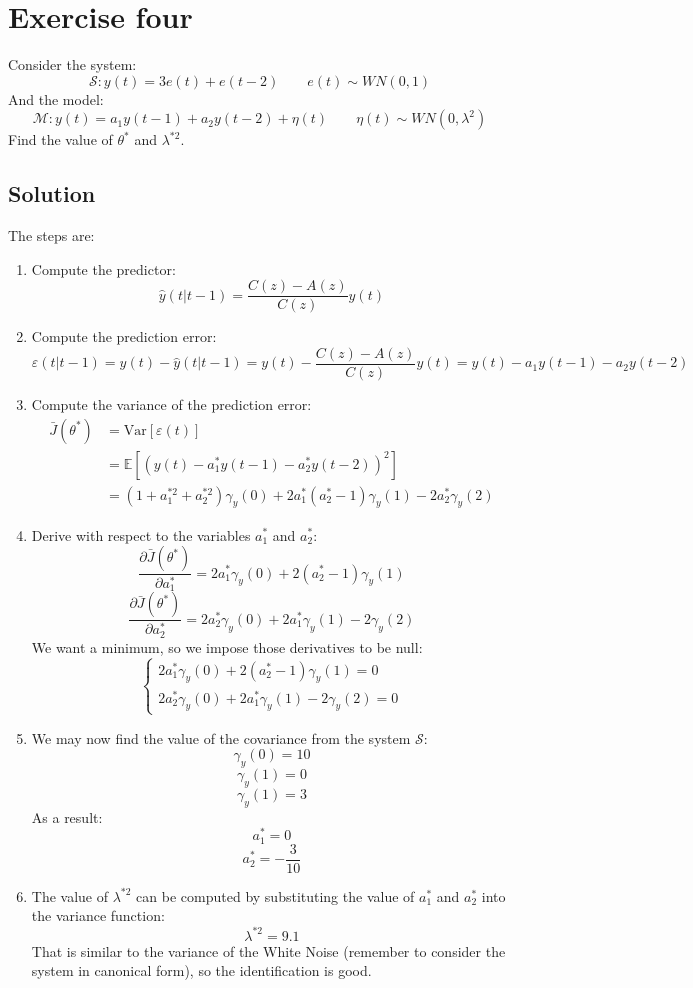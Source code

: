 \section{Exercise four}

Consider the system: 
\[\mathcal{S}:y(t)=3e(t)+e(t-2)\qquad e(t)\sim WN(0,1)\]
And the model: 
\[\mathcal{M}:y(t)=a_1y(t-1)+a_2y(t-2)+\eta(t) \qquad \eta(t)\sim WN(0,\lambda^2)\]
Find the value of $\theta^\ast$ and $\lambda^{\ast 2}$. 

\subsection*{Solution}
The steps are: 
\begin{enumerate}
    \item Compute the predictor: 
        \[\hat{y}(t|t-1)=\dfrac{C(z)-A(z)}{C(z)}y(t)\]
    \item Compute the prediction error: 
        \[\varepsilon(t|t-1)=y(t)-\hat{y}(t|t-1)=y(t)-\dfrac{C(z)-A(z)}{C(z)}y(t)=y(t)-a_1y(t-1)-a_2y(t-2)\]
    \item Compute the variance of the prediction error: 
        \begin{align*}
            \bar{J}(\theta^\ast)    &=\text{Var}\left[\varepsilon(t)\right]\\   
                                    &=\mathbb{E}\left[ {\left(y(t)-a_1^\ast y(t-1)-a_2^\ast y(t-2)\right)}^2 \right] \\
                                    &=\left(1+a_1^{ \ast 2}+a_2^{\ast 2}\right)\gamma_y(0)+2a_1^\ast\left(a_2^\ast-1\right)\gamma_y(1)-2a_2^\ast\gamma_y(2)
        \end{align*}
    \item Derive with respect to the variables $a_1^\ast$ and $a_2^\ast$: 
        \[\dfrac{\partial\bar{J}(\theta^\ast)}{\partial a_1^\ast}=2a_1^\ast\gamma_y(0)+2(a_2^\ast-1)\gamma_y(1)\]
        \[\dfrac{\partial\bar{J}(\theta^\ast)}{\partial a_2^\ast}=2a_2^\ast\gamma_y(0)+2a_1^\ast\gamma_y(1)-2\gamma_y(2)\]
        We want a minimum, so we impose those derivatives to be null: 
        \[\begin{cases}
            2a_1^\ast\gamma_y(0)+2(a_2^\ast-1)\gamma_y(1)=0  \\
            2a_2^\ast\gamma_y(0)+2a_1^\ast\gamma_y(1)-2\gamma_y(2)=0
        \end{cases}\]
    \item We may now find the value of the covariance from the system $\mathcal{S}$: 
        \[\gamma_y(0)=10\]
        \[\gamma_y(1)=0\]
        \[\gamma_y(1)=3\]
        As a result: 
        \[a_1^\ast=0\]
        \[a_2^\ast=-\dfrac{3}{10}\]
    \item The value of $\lambda^{\ast 2}$ can be computed by substituting the value of $a_1^\ast$ and $a_2^\ast$ into the variance function: 
        \[\lambda^{\ast 2}=9.1\]
        That is similar to the variance of the White Noise (remember to consider the system in canonical form), so the identification is good. 
\end{enumerate}